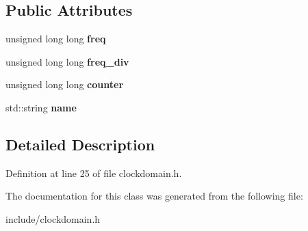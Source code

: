 \subsection*{Public Attributes}
\begin{DoxyCompactItemize}
\item 
\hypertarget{classClockDomain_a0e9fba46cd0af9db7577f19b73fdf929}{unsigned long long {\bfseries freq}}\label{classClockDomain_a0e9fba46cd0af9db7577f19b73fdf929}

\item 
\hypertarget{classClockDomain_af7d2fbf024b15a81fa2c52e398c6e210}{unsigned long long {\bfseries freq\-\_\-div}}\label{classClockDomain_af7d2fbf024b15a81fa2c52e398c6e210}

\item 
\hypertarget{classClockDomain_ac253b451b7f686559b70d972f8612797}{unsigned long long {\bfseries counter}}\label{classClockDomain_ac253b451b7f686559b70d972f8612797}

\item 
\hypertarget{classClockDomain_af1a69ca31af27cf7453b08532d6c520a}{std\-::string {\bfseries name}}\label{classClockDomain_af1a69ca31af27cf7453b08532d6c520a}

\end{DoxyCompactItemize}


\subsection{Detailed Description}


Definition at line 25 of file clockdomain.\-h.



The documentation for this class was generated from the following file\-:\begin{DoxyCompactItemize}
\item 
include/clockdomain.\-h\end{DoxyCompactItemize}
